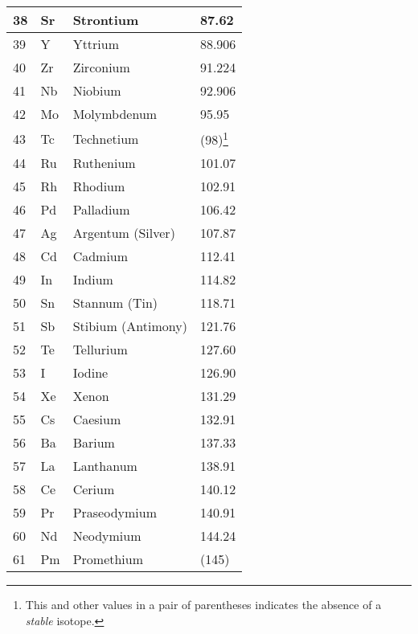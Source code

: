 \documentclass{article}
\begin{document}
\begin{center}
\begin{longtable}{|l|l|l|l|}
 \hline
    38 & Sr & \cellcolor{alkalineyellow}Strontium & 87.62\\
 \hline
    39 & Y & \cellcolor{transred}Yttrium & 88.906\\
 \hline
    40 & Zr & \cellcolor{transred}Zirconium & 91.224\\
 \hline
    41 & Nb & \cellcolor{transred}Niobium & 92.906\\
 \hline
    42 & Mo & \cellcolor{transred}Molymbdenum & 95.95\\
 \hline
    43 & Tc & \cellcolor{transred}Technetium & (98)\footnote{This and other values in a pair of parentheses indicates the absence of a \emph{stable} isotope.}\\
 \hline
    44 & Ru & \cellcolor{transred}Ruthenium & 101.07\\
 \hline
    45 & Rh & \cellcolor{transred}Rhodium & 102.91\\
 \hline
    46 & Pd & \cellcolor{transred}Palladium & 106.42\\
 \hline
    47 & Ag & \cellcolor{transred}Argentum (Silver) & 107.87\\
 \hline
    48 & Cd & \cellcolor{transred}Cadmium & 112.41\\
 \hline
    49 & In & \cellcolor{postblue}Indium & 114.82\\
 \hline
    50 & Sn & \cellcolor{postblue}Stannum (Tin) & 118.71\\
 \hline
    51 & Sb & \cellcolor{metalloid}Stibium (Antimony) & 121.76\\
 \hline
    52 & Te & \cellcolor{metalloid}Tellurium & 127.60\\
 \hline
    53 & I & \cellcolor{rnmgreen}Iodine & 126.90\\
 \hline
    54 & Xe &\cellcolor{noblepink}Xenon & 131.29\\
 \hline
 \hline
    55 & Cs & \cellcolor{alkalibeige}Caesium & 132.91\\
 \hline
    56 & Ba & \cellcolor{alkalineyellow}Barium & 137.33\\
 \hline
    57 & La & \cellcolor{lanthorange}Lanthanum & 138.91\\
 \hline
    58 & Ce & \cellcolor{lanthorange}Cerium & 140.12\\
 \hline
    59 & Pr & \cellcolor{lanthorange}Praseodymium & 140.91\\
 \hline
    60 & Nd & \cellcolor{lanthorange}Neodymium & 144.24\\
 \hline
    61 & Pm & \cellcolor{lanthorange}Promethium & (145)\\

\end{longtable}
\end{center}
\end{document}
